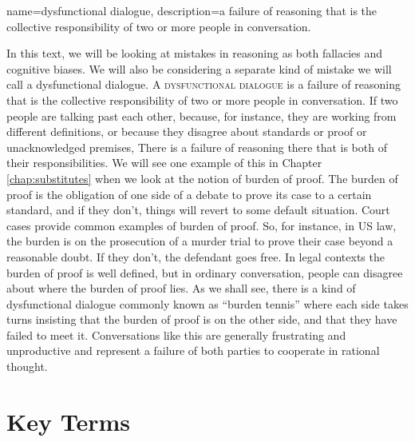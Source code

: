 {
name=dysfunctional dialogue,
description={a failure of reasoning that is the collective responsibility of two or more people in conversation.}
}

In this text, we will be looking at mistakes in reasoning as both fallacies and cognitive biases. We will also be considering a separate kind of mistake we will call a dysfunctional dialogue. A \textsc{\gls{dysfunctional dialogue}} \label{def:dysfunctional_dialogue} is a failure of reasoning that is the collective responsibility of two or more people in conversation. If two people are talking past each other, because, for instance, they are working from different definitions, or because they disagree about standards or proof or unacknowledged premises, There is a failure of reasoning there that is both of their responsibilities. We will see one example of this in Chapter \ref{chap:substitutes} when we look at the notion of burden of proof. The burden of proof is the obligation of one side of a debate to prove its case to a certain standard, and if they don't, things will revert to some default situation. Court cases provide common examples of burden of proof. So, for instance, in US law, the burden is on the prosecution of a murder trial to prove their case beyond a reasonable doubt. If they don't, the defendant goes free. In legal contexts the burden of proof is well defined, but in ordinary conversation, people can disagree about where the burden of proof lies. As we shall see, there is a kind of dysfunctional dialogue commonly known as ``burden tennis'' where each side takes turns insisting that the burden of proof is on the other side, and that they have failed to meet it. Conversations like this are generally frustrating and unproductive and represent a failure of both parties to cooperate in rational thought.  





\section*{Key Terms}
\begin{sortedlist}
\end{sortedlist}


